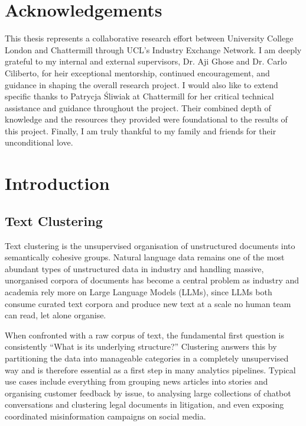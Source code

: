 \documentclass[11pt,a4paper,oneside]{report}
\begin{document}
\clearpage
\chapter*{Acknowledgements}

This thesis represents a collaborative research effort between University College London and Chattermill through UCL's Industry Exchange Network. I am deeply grateful to my internal and external supervisors, Dr. Aji Ghose and Dr. Carlo Ciliberto, for heir exceptional mentorship, continued encouragement, and guidance in shaping the overall research project. I would also like to extend specific thanks to Patrycja Śliwiak at Chattermill for her critical technical assistance and guidance throughout the project. Their combined depth of knowledge and the resources they provided were foundational to the results of this project.  Finally, I am truly thankful to my family and friends for their unconditional love.

\clearpage
\tableofcontents
\clearpage
\listoffigures
\clearpage
\listoftables

\clearpage
{}
\chapter{Introduction}

\section{Text Clustering}

Text clustering is the unsupervised organisation of unstructured documents into semantically cohesive groups. Natural language data remains one of the most abundant types of unstructured data in industry and handling massive, unorganised corpora of documents has become a central problem as industry and academia rely more on Large Language Models (LLMs), since LLMs both consume curated text corpora and produce new text at a scale no human team can read, let alone organise.

When confronted with a raw corpus of text, the fundamental first question is consistently ``What is its underlying structure?'' Clustering answers this by partitioning the data into manageable categories in a completely unsupervised way and is therefore essential as a first step in many analytics pipelines. Typical use cases include everything from grouping news articles into stories and organising customer feedback by issue, to analysing large collections of chatbot conversations and clustering legal documents in litigation, and even exposing coordinated misinformation campaigns on social media.
\end{document}
